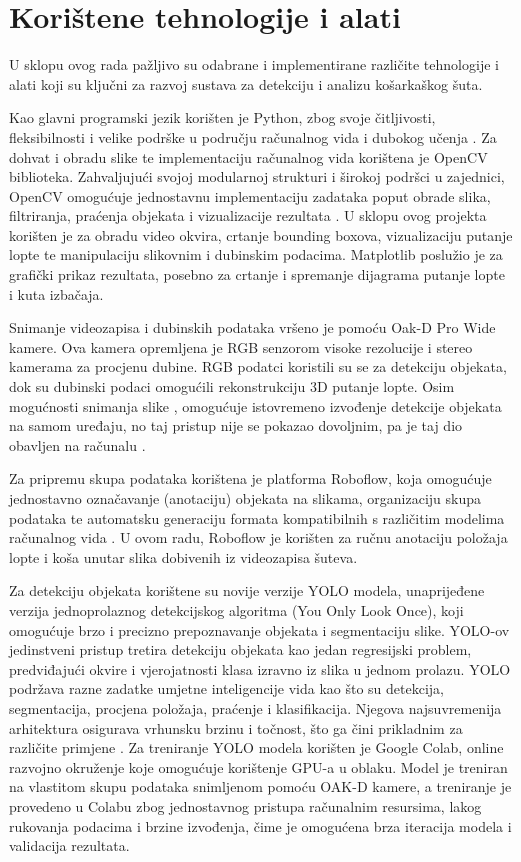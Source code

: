 \documentclass[zavrsnirad]{fer}
\begin{document}
\chapter{Korištene tehnologije i alati}
\label{pog:korištene_tehnologije_i_alati}
U sklopu ovog rada pažljivo su odabrane i implementirane različite tehnologije i alati koji su ključni za razvoj sustava za detekciju i analizu košarkaškog šuta. 

Kao glavni programski jezik korišten je Python, zbog svoje čitljivosti, fleksibilnosti i velike podrške u području računalnog vida i dubokog učenja \cite{python}.
Za dohvat i obradu slike te implementaciju računalnog vida korištena je OpenCV biblioteka. Zahvaljujući svojoj modularnoj strukturi i širokoj podršci u zajednici, OpenCV omogućuje jednostavnu implementaciju zadataka poput obrade slika, filtriranja, praćenja objekata i vizualizacije rezultata \cite{opencv}. 
U sklopu ovog projekta korišten je za obradu video okvira, crtanje bounding boxova, vizualizaciju putanje lopte te manipulaciju slikovnim i dubinskim podacima.
Matplotlib poslužio je za grafički prikaz rezultata, posebno za crtanje i spremanje dijagrama putanje lopte i kuta izbačaja. 

Snimanje videozapisa i dubinskih podataka vršeno je pomoću Oak-D Pro Wide kamere. Ova kamera opremljena je RGB senzorom visoke rezolucije i stereo kamerama za procjenu dubine. 
RGB podatci koristili su se za detekciju objekata, dok su dubinski podaci omogućili rekonstrukciju 3D putanje lopte.
Osim mogućnosti snimanja slike , omogućuje istovremeno izvođenje detekcije objekata na samom uređaju, no taj pristup nije se pokazao dovoljnim, pa je taj dio obavljen na računalu \cite{depthai}.

Za pripremu skupa podataka korištena je platforma Roboflow, koja omogućuje jednostavno označavanje (anotaciju) objekata na slikama, organizaciju skupa podataka te automatsku generaciju formata kompatibilnih s različitim modelima računalnog vida \cite{roboflow}. 
U ovom radu, Roboflow je korišten za ručnu anotaciju položaja lopte i koša unutar slika dobivenih iz videozapisa šuteva.

Za detekciju objekata korištene su novije verzije YOLO modela, unaprijeđene verzija jednoprolaznog detekcijskog algoritma (You Only Look Once), koji omogućuje brzo i precizno prepoznavanje objekata i segmentaciju slike.
YOLO-ov jedinstveni pristup tretira detekciju objekata kao jedan regresijski problem, predviđajući okvire i vjerojatnosti klasa izravno iz slika u jednom prolazu.
YOLO podržava razne zadatke umjetne inteligencije vida kao što su detekcija, segmentacija, procjena položaja, praćenje i klasifikacija.
Njegova najsuvremenija arhitektura osigurava vrhunsku brzinu i točnost, što ga čini prikladnim za različite primjene \cite{ultralytics}.
Za treniranje YOLO modela korišten je Google Colab, online razvojno okruženje koje omogućuje korištenje GPU-a u oblaku. 
Model je treniran na vlastitom skupu podataka snimljenom pomoću OAK-D kamere, a treniranje je provedeno u Colabu zbog jednostavnog pristupa računalnim resursima, lakog rukovanja podacima i brzine izvođenja, čime je omogućena brza iteracija modela i validacija rezultata.
\end{document}
